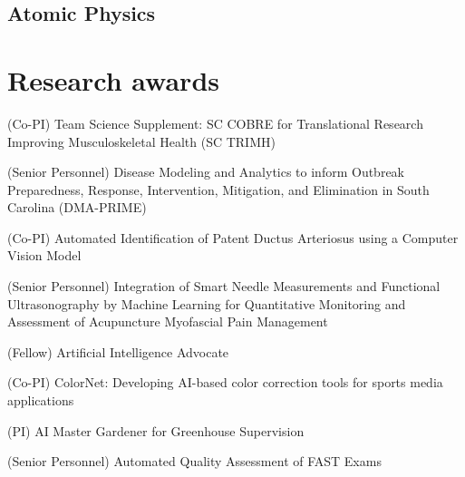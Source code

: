 \documentclass[11pt,letterpaper,roman]{moderncv}        %
\begin{document}
\begin{refsection}
  \nocite{*}
  \printbibliography[heading=none]
\end{refsection}

\subsection{Atomic Physics}

\begin{refsection}
  \nocite{*}
  \printbibliography[heading=none]
\end{refsection}

\section{Research awards}

\quad (Co-PI) Team Science Supplement: SC COBRE for Translational Research Improving Musculoskeletal Health (SC TRIMH)

\quad (Senior Personnel) Disease Modeling and Analytics to inform Outbreak Preparedness, Response, Intervention, Mitigation, and Elimination in South Carolina (DMA-PRIME)

\quad (Co-PI) Automated Identification of Patent Ductus Arteriosus using a Computer Vision Model

\quad (Senior Personnel) Integration of Smart Needle Measurements and Functional Ultrasonography by Machine Learning for Quantitative Monitoring and Assessment of Acupuncture Myofascial Pain Management

\quad (Fellow) Artificial Intelligence Advocate

\quad (Co-PI) ColorNet: Developing AI-based color correction tools for sports media applications

\quad (PI) AI Master Gardener for Greenhouse Supervision

\quad (Senior Personnel) Automated Quality Assessment of FAST Exams
\end{document}

